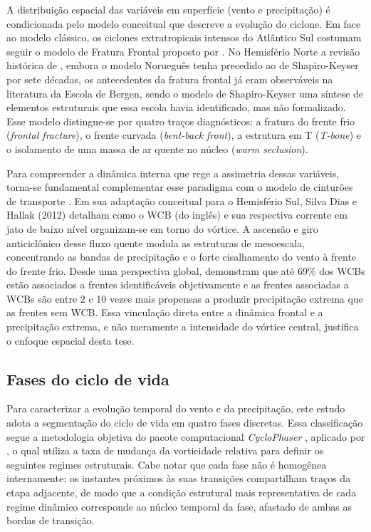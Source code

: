 A distribuição espacial das variáveis em superfície (vento e precipitação) é condicionada pelo modelo conceitual que descreve a evolução do ciclone. Em face ao modelo clássico, os ciclones extratropicais intensos do Atlântico Sul costumam seguir o modelo de Fratura Frontal proposto por \citet{shapiro1990life}. No Hemisfério Norte a revisão histórica de \citet{schultz2021antecedents}, embora o modelo Norueguês tenha precedido ao de Shapiro-Keyser por sete décadas, os antecedentes da fratura frontal já eram observáveis na literatura da Escola de Bergen, sendo o modelo de Shapiro-Keyser uma síntese de elementos estruturais que essa escola havia identificado, mas não formalizado. Esse modelo distingue-se por quatro traços diagnósticos: a fratura do frente frio (\textit{frontal fracture}), o frente curvada (\textit{bent-back front}), a estrutura em T (\textit{T-bone}) e o isolamento de uma massa de ar quente no núcleo (\textit{warm seclusion}).

Para compreender a dinâmica interna que rege a assimetria dessas variáveis, torna-se fundamental complementar esse paradigma com o modelo de cinturões de transporte \citep{browning1986conceptual}. Em sua adaptação conceitual para o Hemisfério Sul, Silva Dias e Hallak (2012) detalham como o WCB (do inglês) %
e sua respectiva corrente em jato de baixo nível organizam-se em torno do vórtice. A ascensão e giro anticiclônico desse fluxo quente modula as estruturas de mesoescala, concentrando as bandas de precipitação e o forte cisalhamento do vento à frente do frente frio. 
Desde uma perspectiva global, \citet{catto2015fronts} demonstram que até 69\% dos WCBs estão associados a frentes identificáveis objetivamente e as frentes associadas a WCBs são entre 2 e 10 vezes mais propensas a produzir precipitação extrema que as frentes sem WCB. 
Essa vinculação direta entre a dinâmica frontal e a precipitação extrema, e não meramente a intensidade do vórtice central, justifica o enfoque espacial desta tese.

\subsection{Fases do ciclo de vida}\label{subsec:tb_fases}
Para caracterizar a evolução temporal do vento e da precipitação, este estudo adota a segmentação do ciclo de vida em quatro fases discretas. Essa classificação segue a metodologia objetiva do pacote computacional \textit{CycloPhaser} \citep{deSouza2025CycloPhaser}, aplicado por \citet{coutodesouza2024new}, o qual utiliza a taxa de mudança da vorticidade relativa para definir os seguintes regimes estruturais. Cabe notar que cada fase não é homogênea internamente: os instantes próximos às suas transições compartilham traços da etapa adjacente, de modo que a condição estrutural mais representativa de cada regime dinâmico corresponde ao núcleo temporal da fase, afastado de ambas as bordas de transição.

